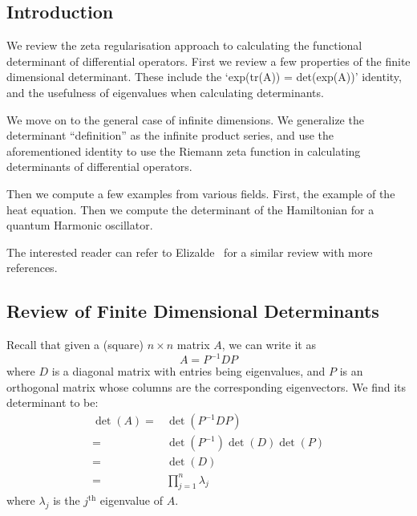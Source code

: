 \subsection{Introduction}

We review the zeta regularisation approach to calculating the functional
determinant of differential operators. First we review a few
properties of the finite dimensional determinant. These include
the `exp(tr(A)) = det(exp(A))' identity, and the usefulness of
eigenvalues when calculating determinants. 

We move on to the general case of infinite dimensions. We
generalize the determinant ``definition'' as the infinite product
series, and use the aforementioned identity to use the Riemann
zeta function in calculating determinants of differential
operators.

Then we compute a few examples from various fields. First, the
example of the heat equation. Then we compute the determinant of
the Hamiltonian for a quantum Harmonic oscillator. 

The interested reader can refer to
Elizalde~\cite{Elizalde:1999zy} for a similar review with more
references. 

\subsection{Review of Finite Dimensional Determinants}

Recall that given a (square) $n\times n$ matrix $A$, we can write it as
\begin{equation}
A = P^{-1}DP
\end{equation}
where $D$ is a diagonal matrix with entries being eigenvalues,
and $P$ is an orthogonal matrix whose columns are the
corresponding eigenvectors. We find its determinant to be:
\begin{equation}
\begin{split}
\det{(A)}  =& \det{(P^{-1}DP)}\\
 =&  \det{(P^{-1})}\det{(D)}\det{(P)}\\
 =&  \det{(D)}\\
 =&  \prod_{j=1}^{n} \lambda_{j}
\label{eq:det}
\end{split}
\end{equation}
where $\lambda_{j}$ is the $j^{\text{th}}$ eigenvalue of $A$. 

